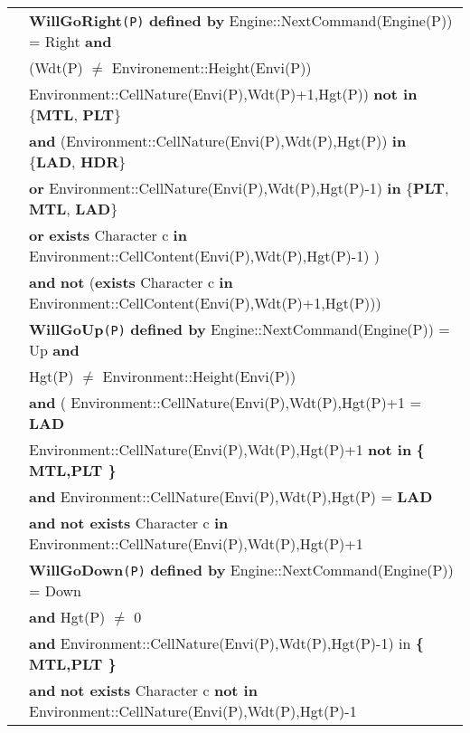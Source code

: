 \documentclass{article}
\begin{document}
\begin{tabular}{rl}
& \textbf{WillGoRight}\texttt{(P)} \textbf{defined by}   \textrm{Engine::NextCommand(Engine(P))  = Right} \textbf{and}\\

&  \quad (\textrm{Wdt(P)} $\neq$ \textrm{Environement::Height(Envi(P))} \\ & \textrm{Environment::CellNature(Envi(P),Wdt(P)+1,Hgt(P))} \textbf{not in} \{\textbf{MTL}, \textbf{PLT}\} \\
& \quad\quad \textbf{and} (\textrm{Environment::CellNature(Envi(P),Wdt(P),Hgt(P))} \textbf{in} \{\textbf{LAD}, \textbf{HDR}\} \\
& \quad\quad\quad\quad \textbf{or} \textrm{Environment::CellNature(Envi(P),Wdt(P),Hgt(P)-1)} \textbf{in} \{\textbf{PLT}, \textbf{MTL}, \textbf{LAD}\} \\
& \quad\quad\quad\quad \textbf{or} \textbf{exists} \textrm{Character} c \textbf{in} \textrm{Environment::CellContent(Envi(P),Wdt(P),Hgt(P)-1)} ) \\
& \quad\quad \textbf{and} \textbf{not} (\textbf{exists} \textrm{Character} c \textbf{in} \textrm{Environment::CellContent(Envi(P),Wdt(P)+1,Hgt(P))}) \\

& \textbf{WillGoUp}\texttt{(P)} \textbf{defined by}   \textrm{Engine::NextCommand(Engine(P))  = Up} \textbf{and}\\

&  \quad\textrm{Hgt(P)} $\neq$ \textrm{Environment::Height(Envi(P))} \\
& \quad \textbf{and} (
    \textrm{Environment::CellNature(Envi(P),Wdt(P),Hgt(P)+1} = \textbf{LAD} \\
& \quad\quad  \textrm{Environment::CellNature(Envi(P),Wdt(P),Hgt(P)+1} \textbf{not in } \textbf{ \{ MTL,PLT \}} \\
& \quad \textbf{and} \textrm{Environment::CellNature(Envi(P),Wdt(P),Hgt(P)} = \textbf{LAD} \\
& \quad \textbf{and} \textbf{not exists} \textrm{Character} c \textbf{in} \textrm{Environment::CellNature(Envi(P),Wdt(P),Hgt(P)+1} \\

& \textbf{WillGoDown}\texttt{(P)} \textbf{defined by}  \textrm{Engine::NextCommand(Engine(P))  = Down}\\

& \quad  \textbf{and} \textrm{Hgt(P)} $\neq$ 0 \\
& \quad \textbf{and} \textrm{Environment::CellNature(Envi(P),Wdt(P),Hgt(P)-1)} \textrm{in} \textbf{ \{ MTL,PLT \} } \\
& \quad \textbf{and} \textbf{not exists} \textrm{Character} c \textbf{ not in} \textrm{Environment::CellNature(Envi(P),Wdt(P),Hgt(P)-1} \\


\end{tabular}
\end{document}
